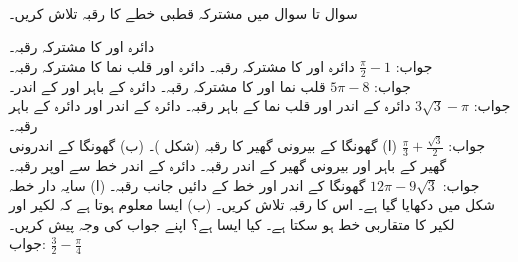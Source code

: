 \\
سوال  تا سوال  میں مشترکہ قطبی خطے کا رقبہ تلاش کریں۔

دائرہ  اور  کا مشترکہ رقبہ۔\\
جواب:\quad
$\tfrac{\pi}{2}-1$
دائرہ  اور  کا مشترکہ رقبہ۔
دائرہ  اور قلب نما  کا مشترکہ رقبہ۔\\
جواب:\quad
$5\pi-8$
قلب نما  اور  کا مشترکہ رقبہ۔
دائرہ  کے باہر اور  کے اندر۔\\
جواب:\quad
$3\sqrt{3}-\pi$
دائرہ  کے اندر اور قلب نما  کے باہر رقبہ۔ 
دائرہ  کے اندر اور دائرہ  کے باہر رقبہ۔\\
جواب:\quad
$\tfrac{\pi}{3}+\tfrac{\sqrt{3}}{2}$
(ا) گھونگا  کے بیرونی گھیر کا رقبہ (شکل )۔  (ب) گھونگا  کے اندرونی گھیر کے باہر اور بیرونی گھیر کے اندر رقبہ۔
دائرہ  کے اندر خط  سے اوپر  رقبہ۔\\
جواب:\quad
$12\pi-9\sqrt{3}$
گھونگا کے اندر اور خط  کے دائیں جانب رقبہ۔
(ا) سایہ دار خطہ شکل  میں دکھایا گیا ہے۔ اس  کا رقبہ تلاش کریں۔ (ب) ایسا معلوم ہوتا ہے کہ  لکیر  اور لکیر  کا متقاربی خط ہو سکتا ہے۔ کیا ایسا ہے؟ اپنے جواب کی وجہ پیش کریں۔\\
جواب:\quad
$\tfrac{3}{2}-\tfrac{\pi}{4}$
